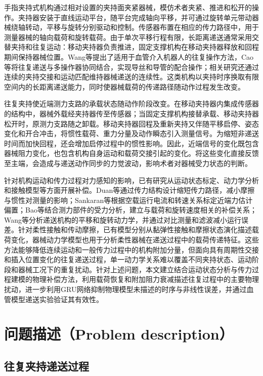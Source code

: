 \documentclass{JQR_LaTeX_Template-0507/JQRnew}
\begin{document}
 手指夹持式机构通过相对设置的夹持面夹紧器械，模仿术者夹紧、推进和松开的操作。夹持器安装于直线运动平台，随平台完成轴向平移，并可通过旋转单元带动器械绕轴转动，平移与旋转分别驱动和控制。传感器布置在相应的传力路径中，用于测量器械的轴向载荷和旋转载荷。由于单次平移行程有限，长距离递送通常采用交替夹持和往复运动：移动夹持器负责推进，固定支撑机构在移动夹持器释放和回程期间保持器械位置。Wang等提出了适用于血管介入机器人的往复操作方法，Cao等将往复递送与多操作器协同结合，实现导丝和导管的配合操作；相关研究还通过连续的夹持交接和运动匹配维持器械递送的连续性。这类机构以夹持时序换取有限空间内的长距离递送能力，同时使器械载荷的传递路径随动作过程发生改变。

 往复夹持使近端测力支路的承载状态随动作阶段改变。在移动夹持器内集成传感器的结构中，器械外载经夹持器传至传感器；当固定支撑机构接替承载、移动夹持器松开时，原测力支路随之卸载。移动夹持器回程及重新夹持又伴随平移启停、姿态变化和开合冲击，将惯性载荷、重力分量及动作瞬态引入测量信号。为缩短非递送时间而加快回程，还会增加启停过程中的惯性影响。因此，近端信号的变化既包含器械阻力变化，也包含机构自身运动和载荷交接引起的变化。将这些变化直接反馈至主端，会造成与递送动作同步的力觉波动，影响术者对器械受力状态的判断。

 针对机构运动和传力过程对力感知的影响，已有研究从运动状态标定、动力学分析和接触模型等方面开展补偿。Duan等通过传力结构设计缩短传力路径，减小摩擦与惯性对测量的影响；Sankaran等根据空载运行电流和转速关系标定近端力估计偏置；Bao等结合测力部件的受力分析，建立与载荷和旋转速度相关的补偿关系；Wang等分析递送机构的平移和旋转动力学，并通过对比测量和滤波减小运行误差。针对柔性接触和传动摩擦，已有模型分别从黏弹性接触和摩擦状态演化描述载荷变化，器械动力学模型也用于分析柔性器械在递送过程中的载荷传递特征。这些方法能够降低连续运动和一般传力过程中的机构附加分量，但面向具有周期性交接和插入位置变化的往复递送过程，单一动力学关系难以覆盖不同夹持状态、运动阶段和器械工况下的重复扰动。针对上述问题，本文建立结合运动状态分析与传力过程建模的物理补偿方法，利用载荷恢复和附加阻力衰减描述往复过程中的主要物理扰动，进一步利用GRU网络抑制物理模型未描述的时序与非线性误差，并通过血管模型递送实验验证其有效性。



\section{问题描述（Problem description）}

\subsection{往复夹持递送过程}
\end{document}
